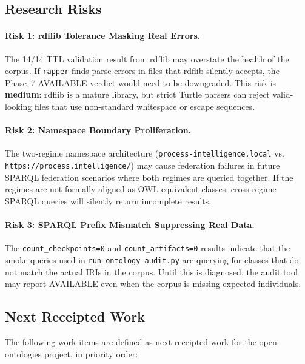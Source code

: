 \subsection{Research Risks}
\label{sec:research-open-ontologies-risks}

\paragraph{Risk 1: rdflib Tolerance Masking Real Errors.}
The 14/14 TTL validation result from rdflib may overstate the health of the corpus. If
\texttt{rapper} finds parse errors in files that rdflib silently accepts, the Phase~7
AVAILABLE verdict would need to be downgraded. This risk is \textbf{medium}: rdflib is
a mature library, but strict Turtle parsers can reject valid-looking files that use
non-standard whitespace or escape sequences.

\paragraph{Risk 2: Namespace Boundary Proliferation.}
The two-regime namespace architecture (\texttt{process-intelligence.local} vs.
\texttt{https://process.intelligence/}) may cause federation failures in future SPARQL
federation scenarios where both regimes are queried together. If the regimes are not
formally aligned as OWL equivalent classes, cross-regime SPARQL queries will silently
return incomplete results.

\paragraph{Risk 3: SPARQL Prefix Mismatch Suppressing Real Data.}
The \texttt{count\_checkpoints=0} and \texttt{count\_artifacts=0} results indicate that
the smoke queries used in \texttt{run-ontology-audit.py} are querying for classes that
do not match the actual IRIs in the corpus. Until this is diagnosed, the audit tool may
report AVAILABLE even when the corpus is missing expected individuals.

\subsection{Next Receipted Work}
\label{sec:research-open-ontologies-next-work}

The following work items are defined as next receipted work for the open-ontologies project,
in priority order:

